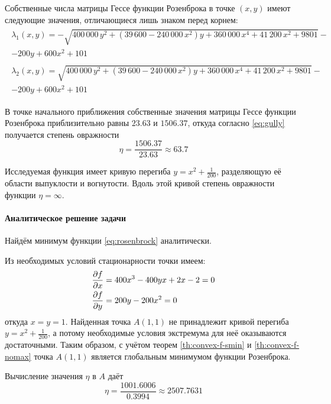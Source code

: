 Собственные числа матрицы Гессе функции Розенброка в точке $(x, y)$
имеют следующие значения, отличающиеся лишь знаком перед корнем:
\begin{gather*}
  \begin{split}
    \lambda_1(x, y) = -\sqrt{400\,000\,y^2 +
      \left(39\,600-240\,000\,x^2\right)y + 360\,000\,x^4 +
      41\,200\,x^2+9801}- \\
    - 200y+600x^2+101
  \end{split}\\
  \begin{split}
    \lambda_2(x, y) = \sqrt{400\,000\,y^2 +
      \left(39\,600-240\,000\,x^2\right)y + 360\,000\,x^4 +
      41\,200\,x^2+9801}- \\
    - 200y+600x^2+101
  \end{split}
\end{gather*}

В точке начального приближения собственные значения матрицы Гессе
функции Розенброка приблизительно равны $23.63$ и $1506.37$, откуда
согласно \eqref{eq:gully} получается степень овражности
\begin{equation}
  \label{eq:rosenbrock-gully-start}
  \eta = \frac{1506.37}{23.63} \approx 63.7
\end{equation}

Исследуемая функция имеет кривую перегиба $y=x^2+\frac{1}{200}$,
разделяющую её области выпуклости и вогнутости. Вдоль этой кривой
степень овражности функции $\eta = \infty$.

\paragraph{Аналитическое решение задачи}

Найдём минимум функции \eqref{eq:rosenbrock} аналитически.

Из необходимых условий стационарности точки имеем:
\begin{align*}
  \frac{\partial{f}}{\partial{x}} &= 400x^3-400yx+2x-2 = 0 \\
  \frac{\partial{f}}{\partial{y}} &= 200y-200x^2 = 0
\end{align*}
откуда $x = y = 1$. Найденная точка $A(1, 1)$ не принадлежит кривой
перегиба $y = x^2+\frac{1}{200}$, а потому необходимые условия
экстремума для неё оказываются достаточными. Таким образом, с учётом
теорем \ref{th:convex-f-smin} и \ref{th:convex-f-nomax} точка $A(1, 1)$
является глобальным минимумом функции Розенброка.

Вычисление значения $\eta$ в $A$ даёт
\begin{equation}
  \label{eq:rosenbrock-gully-extr}
  \eta = \frac{1001.6006}{0.3994} \approx 2507.7631
\end{equation}

